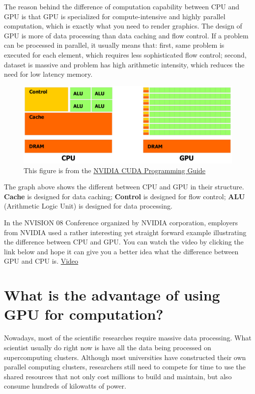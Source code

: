 \documentclass[letterpaper,10pt,openany,oneside]{sphinxmanual}
\begin{document}
The reason behind the difference of computation capability between CPU and GPU is that GPU is specialized for compute-intensive and highly parallel computation, which is exactly what you need to render graphics. The design of GPU is more of data processing than data caching and flow control. If a problem can be processed in parallel, it usually means that: first, same problem is executed for each element, which requires less sophisticated flow control; second, dataset is massive and problem has high arithmetic intensity, which reduces the need for low latency memory.
\begin{figure}[htbp]
\centering
\capstart

\includegraphics{CPUGPU.png}
\caption{This figure is from the \href{http://developer.download.nvidia.com/compute/DevZone/docs/html/C/doc/CUDA\_C\_Programming\_Guide.pdf}{NVIDIA CUDA Programming Guide}}\end{figure}

The graph above shows the different between CPU and GPU in their structure. \textbf{Cache} is designed for data caching; \textbf{Control} is designed for flow control; \textbf{ALU} (Arithmetic Logic Unit) is designed for data processing.

In the NVISION 08 Conference organized by NVIDIA corporation, employers from NVIDIA used a rather interesting yet straight forward example illustrating the difference between CPU and GPU. You can watch the video by clicking the link below and hope it can give you a better idea what the difference between GPU and CPU is.
\href{http://www.NVIDIA.com/object/nvision08\_gpu\_v\_cpu.html}{Video}


\section{What is the advantage of using GPU for computation?}
\label{Introduction/Introduction:nvidia-cuda-programming-guide}\label{Introduction/Introduction:what-is-the-advantage-of-using-gpu-for-computation}
Nowadays, most of the scientific researches require massive data processing. What scientist usually do right now is have all the data being processed on supercomputing clusters. Although most universities have constructed their own parallel computing clusters, researchers still need to compete for time to use the shared resources that not only cost millions to build and maintain, but also consume hundreds of kilowatts of power.
\end{document}
